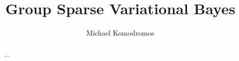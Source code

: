 \documentclass[12pt]{article}
\title{Group Sparse Variational Bayes}
\author{Michael Komodromos}
\begin{document}
\maketitle


\begin{abstract}
    ...
\end{abstract}

\newpage
\tableofcontents




% 
% 
% 


\newpage



\end{document}
